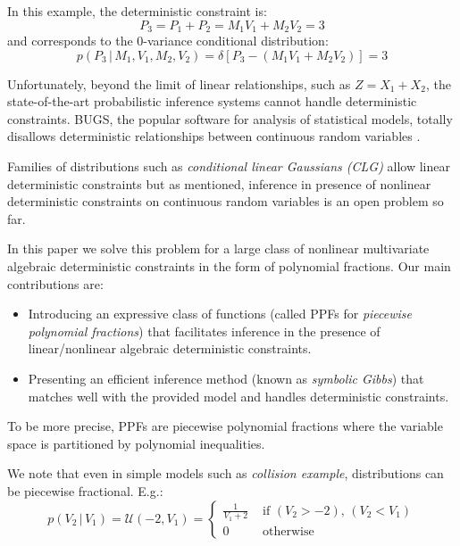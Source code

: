 \documentclass[letterpaper]{article}
\newcommand{\case}[2]{#2 &\text{ if } #1}%
\newcommand{\otherwise}[1]{#1 &\text{ otherwise}}
\newcommand{\pr}{p}
\begin{document}
In this example, the deterministic constraint is: 
\begin{equation}
\label{eq:moment-constraint}
P_3 = P_1 + P_2 = M_1 V_1 + M_2 V_2 = 3
\end{equation}
and corresponds to the 0-variance conditional distribution: 
$$
\pr(P_3 \,|\, M_1, V_1, M_2, V_2) = \delta[P_3 - (M_1 V_1 + M_2 V_2)] = 3
$$

Unfortunately, 
beyond the limit of linear relationships, such as $Z = X_1 + X_2$, 
the state-of-the-art probabilistic inference systems cannot handle deterministic constraints.
BUGS, the popular software for analysis of statistical models, 
totally disallows deterministic relationships between continuous random variables \cite{lunn2009bugs}.

Families of distributions such as \emph{conditional linear Gaussians (CLG)} \cite{lauritzen2001stable}
allow linear deterministic constraints but as mentioned, inference in presence of nonlinear deterministic constraints on continuous random variables is an open problem so far.

In this paper we solve this problem for a large class of nonlinear multivariate algebraic deterministic constraints in the form of polynomial fractions. 
Our main contributions are:
\begin{itemize}
\item Introducing  an expressive class of functions 
(called PPFs for \emph{piecewise polynomial fractions}) that facilitates inference in the presence of  linear/nonlinear algebraic deterministic constraints.
\item Presenting an efficient inference method (known as \emph{symbolic Gibbs}) that matches well with the provided model and handles deterministic constraints.  
\end{itemize}

To be more precise, PPFs are piecewise polynomial fractions where the variable space is partitioned by polynomial inequalities.

We note that 
even in simple models such as \emph{collision example}, distributions can be piecewise fractional. E.g.:  
\[
\pr(V_2 \,|\, V_1) = \mathcal{U}(-2, V_1)
=
\begin{cases}
  \case{\scriptstyle (V_2 > -2), \, (V_2 < V_1)}{\frac{1}{V_1 + 2}}\\
 \otherwise{0}
 \end{cases}
\]
\end{document}
